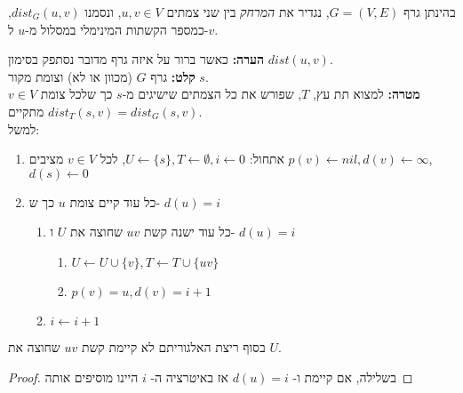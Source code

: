 \begin{definition}[מרחק]
בהינתן גרף 
$G = (V, E)$,
נגדיר את 
\emph{המרחק}
בין שני צמתים 
$u,v \in V$,
ונסמנו 
$dist_G(u,v)$,
כמספר הקשתות המינימלי במסלול מ-$u$ ל-$v$.
\end{definition}
\noindent
\textbf{הערה:}
כאשר ברור על איזה גרף מדובר נסתפק בסימון 
$dist(u,v)$.
\vspace{5mm}
\\
\textbf{קלט:}
גרף $G$ (מכוון או לא) וצומת מקור $s$.
\\
\textbf{מטרה:}
למצוא תת עץ, $T$, שפורש את כל הצמתים שישיגים מ-$s$ כך שלכל צומת 
$v \in V$
מתקיים
$dist_T(s, v) = dist_G(s, v)$.
\\
למשל:
\begin{center}
\end{center}

\begin{enumerate}
\item
אתחול:
$U \leftarrow \{s\}, T \leftarrow \emptyset, i \leftarrow 0$, 
לכל 
$v \in V$
מציבים
$p(v) \leftarrow nil, d(v) \leftarrow \infty$,
$d(s) \leftarrow 0$
\item 
כל עוד קיים צומת $u$ כך ש-%
$d(u) = i$
\label{item:bfs:while}
\begin{enumerate}
	\item 
	כל עוד ישנה קשת 
	$uv$
	שחוצה את $U$ ו-%
	$d(u) = i$
		\begin{enumerate}
		\item
		$U \leftarrow U \cup \{v\}, T \leftarrow T \cup \{uv\}$
		\item
		$p(v) = u, d(v) = i + 1$
		\end{enumerate}
	\item
	$i \leftarrow i+1$
	\end{enumerate}
\end{enumerate}
\begin{claim}
בסוף ריצת האלגוריתם לא קיימת קשת 
$uv$
שחוצה את $U$.
\end{claim}
\begin{proof}
בשלילה, אם קיימת ו-%
$d(u) = i$
אז באיטרציה ה-%
$i$
היינו מוסיפים אותה
\end{proof}

